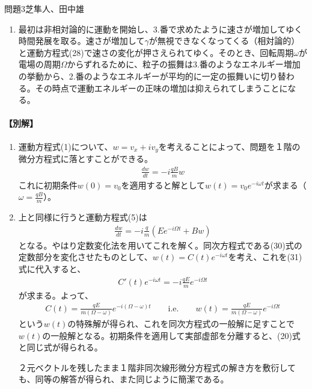 \documentclass[fleqn]{jbook}
\begin{document}
\begin{answer}{問題3}{芝隼人、田中雄}
\begin{enumerate}
となる。あとは1.番と全く同様に解くことができて、
\begin{eqnarray}
\left( \begin{array}{c}{}
v_x \\ v_y \end{array}\right) = -v_0\left( \begin{array}{c}{}
\cos(\omega t) \\ \sin(\omega t) \end{array}\right) ,\quad \textrm{where}\ \omega = \frac{qB}{m\gamma}
\end{eqnarray}
である。
\item
最初は非相対論的に運動を開始し、3.番で求めたように速さが増加してゆく時間発展を取る。速さが増加して$\gamma$が無視できなくなってくる（相対論的）と運動方程式(28)で速さの変化が押さえられてゆく。そのとき、回転周期$\omega$が電場の周期$\Omega$からずれるために、粒子の振舞は3.番のようなエネルギー増加の挙動から、2.番のようなエネルギーが平均的に一定の振舞いに切り替わる。その時点で運動エネルギーの正味の増加は抑えられてしまうことになる。


\end{enumerate}
\paragraph{【別解】}
\begin{enumerate}
\item
運動方程式(1)について、$w=v_x+ iv_y$を考えることによって、問題を１階の微分方程式に落とすことができる。
\begin{eqnarray}
\frac{dw}{dt} = -i\frac{qB}{m}w
\end{eqnarray}
これに初期条件$w(0) = v_0$を適用すると解として$w(t) = v_0e^{-i\omega t}$が求まる（$\omega = \frac{qB}{m}$）。
\item
上と同様に行うと運動方程式(5)は
\begin{eqnarray}
\frac{dw}{dt} = -i\frac{q}{m}\left( Ee^{-i\Omega t} +Bw \right)
\end{eqnarray}
となる。やはり定数変化法を用いてこれを解く。同次方程式である(30)式の定数部分を変化させたものとして、$w(t) = C(t)e^{-i\omega t}$を考え、これを(31)式に代入すると、
\begin{eqnarray}
C'(t)e^{-i\omega t}= -i\frac{qE}{m}e^{-i\Omega t}
\end{eqnarray}
が求まる。よって、
\begin{eqnarray}
C(t) = \frac{qE}{m(\Omega -\omega )}e^{-i(\Omega -\omega )t}\qquad\textrm{i.e.}\qquad w(t) = \frac{qE}{m(\Omega -\omega )}e^{-i\Omega t} 
\end{eqnarray}
という$w(t)$の特殊解が得られ、これを同次方程式の一般解に足すことで$w(t)$の一般解となる。初期条件を適用して実部虚部を分離すると、(20)式と同じ式が得られる。

２元ベクトルを残したまま１階非同次線形微分方程式の解き方を敷衍しても、同等の解答が得られ、また同じように簡潔である。
\end{enumerate}
\end{answer}
\end{document}
